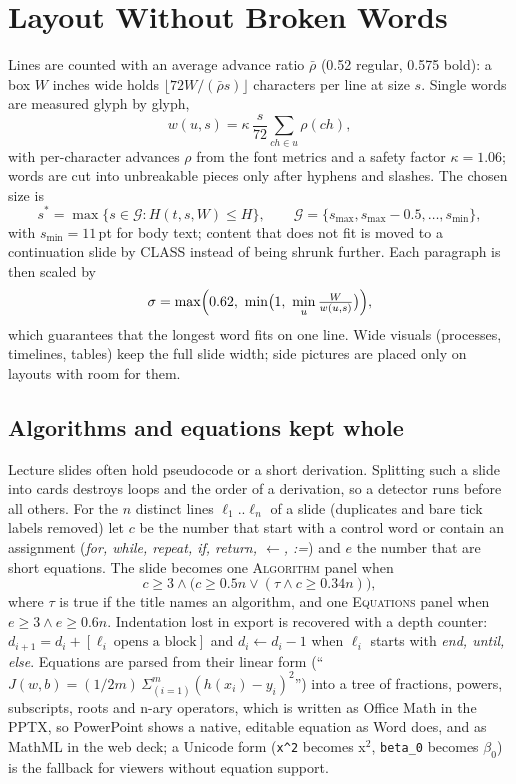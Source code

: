 \documentclass[conference]{IEEEtran}
\begin{document}
\section{Layout Without Broken Words}
\label{sec:layout}
Lines are counted with an average advance ratio $\bar\rho$ (0.52 regular, 0.575 bold): a box $W$ inches wide holds
$\lfloor 72W/(\bar\rho s)\rfloor$ characters per line at size $s$. Single words are measured glyph by glyph,
\begin{equation}
w(u,s)=\kappa\,\frac{s}{72}\sum_{ch\in u}\rho(ch),
\end{equation}
with per-character advances $\rho$ from the font metrics and a safety factor $\kappa=1.06$; words are cut into unbreakable
pieces only after hyphens and slashes. The chosen size is
\begin{equation}
s^{*}=\max\{s\in\mathcal{G}: H(t,s,W)\le H\},\qquad \mathcal{G}=\{s_{\max},s_{\max}-0.5,\dots,s_{\min}\},
\end{equation}
with $s_{\min}=11$\,pt for body text; content that does not fit is moved to a continuation slide by CLASS instead of being
shrunk further. Each paragraph is then scaled by
\begin{equation}
\sigma=\max\Bigl(0.62,\ \min\bigl(1,\ \min_{u}\tfrac{W}{w(u,s)}\bigr)\Bigr),
\end{equation}
which guarantees that the longest word fits on one line. Wide visuals (processes, timelines, tables) keep the full slide
width; side pictures are placed only on layouts with room for them.

\subsection{Algorithms and equations kept whole}
Lecture slides often hold pseudocode or a short derivation. Splitting such a slide into cards destroys loops and the order of
a derivation, so a detector runs before all others. For the $n$ distinct lines $\ell_1..\ell_n$ of a slide (duplicates and
bare tick labels removed) let $c$ be the number that start with a control word or contain an assignment
(\emph{for, while, repeat, if, return, $\leftarrow$, :=}) and $e$ the number that are short equations. The slide becomes one
\textsc{Algorithm} panel when
\begin{equation}
c\ge 3 \wedge \bigl(c\ge 0.5n \vee (\tau \wedge c\ge 0.34n)\bigr),
\end{equation}
where $\tau$ is true if the title names an algorithm, and one \textsc{Equations} panel when $e\ge3 \wedge e\ge0.6n$.
Indentation lost in export is recovered with a depth counter: $d_{i+1}=d_i+[\ell_i\ \text{opens a block}]$ and
$d_i\leftarrow d_i-1$ when $\ell_i$ starts with \emph{end, until, else}. Equations are parsed from their linear form
(``$J(w,b)=(1/2m)\,\Sigma_{(i=1)}^{m}(h(x_i)-y_i)^2$'') into a tree of fractions, powers, subscripts, roots and n-ary
operators, which is written as Office Math in the PPTX, so PowerPoint shows a native, editable equation as Word does, and as
MathML in the web deck; a Unicode form (\texttt{x\^{}2} becomes x$^2$, \texttt{beta\_0} becomes $\beta_0$) is the fallback for viewers without equation support.
\end{document}
